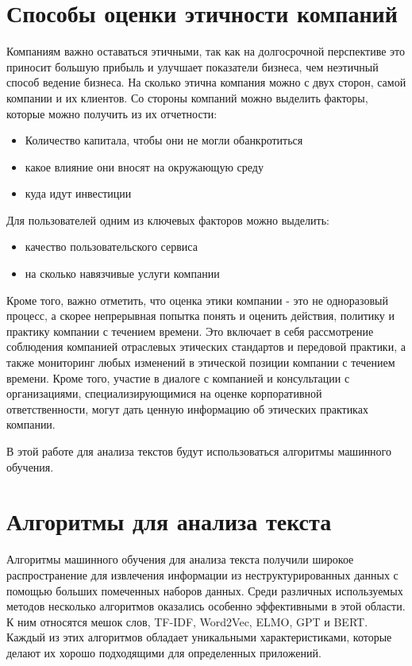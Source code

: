 \documentclass[PI, VKR]{HSEUniversity}
\begin{document}
\section{Способы оценки этичности компаний}
\label{sec:org6d93754}
Компаниям важно оставаться этичными, так как на долгосрочной перспективе это приносит большую прибыль и улучшает показатели бизнеса, чем неэтичный способ ведение бизнеса\autocites{climent_ethical_2018}[][]{mure_esg_2021}. На сколько этична компания можно с двух сторон, самой компании и их клиентов. Со стороны компаний можно выделить факторы, которые можно получить из их отчетности:
\begin{itemize}
\item Количество капитала, чтобы они не могли обанкротиться
\item какое влияние они вносят на окружающую среду
\item куда идут инвестиции\autocite{harvey1995ethical}
\end{itemize}

Для пользователей одним из ключевых факторов можно выделить:
\begin{itemize}
\item качество пользовательского сервиса\autocite{brunk2010exploring}
\item на сколько навязчивые услуги компании\autocite{mitchell1992bank}
\end{itemize}

Кроме того, важно отметить, что оценка этики компании - это не одноразовый процесс, а скорее непрерывная попытка понять и оценить действия, политику и практику компании с течением времени. Это включает в себя рассмотрение соблюдения компанией отраслевых этических стандартов и передовой практики, а также мониторинг любых изменений в этической позиции компании с течением времени. Кроме того, участие в диалоге с компанией и консультации с организациями, специализирующимися на оценке корпоративной ответственности, могут дать ценную информацию об этических практиках компании.

В этой работе для анализа текстов будут использоваться алгоритмы машинного обучения.
\section{Алгоритмы для анализа текста}
\label{sec:org69c83f5}
Алгоритмы машинного обучения для анализа текста получили широкое распространение для извлечения информации из неструктурированных данных с помощью больших помеченных наборов данных. Среди различных используемых методов несколько алгоритмов оказались особенно эффективными в этой области. К ним относятся мешок слов\autocite{doi:10.1080/00437956.1954.11659520}, TF-IDF\autocite{jones1972statistical}, Word2Vec\autocite{mikolov2013distributed}, ELMO\autocite{elmo}, GPT\autocite{radford2019language} и BERT\autocite{devlin2018bert}. Каждый из этих алгоритмов обладает уникальными характеристиками, которые делают их хорошо подходящими для определенных приложений.
\end{document}
